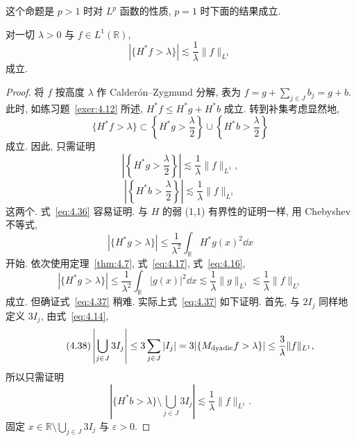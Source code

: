 这个命题是 $p > 1$ 时对 $L^{p}$ 函数的性质, $p = 1$ 时下面的结果成立.

\begin{theorem}\label{thm:4.8}
对一切 $\lambda > 0$ 与 $f \in L^{1}(\mathbb{R})$,
\begin{equation}\tag{4.34}
|\{H^{*}f > \lambda\}| \lesssim \frac{1}{\lambda}\|f\|_{L^{1}}
\label{eq:4.34}
\end{equation}
成立.
\end{theorem}

\begin{proof}
将 $f$ 按高度 $\lambda$ 作 Calderón--Zygmund 分解, 表为 $f = g + \sum_{j \in J}b_{j} = g + b$. 此时, 如练习题~\ref{exer:4.12} 所述, $H^{*}f \leq H^{*}g + H^{*}b$ 成立. 转到补集考虑显然地,
\begin{equation}\tag{4.35}
\{H^{*}f > \lambda\} \subset \left\{H^{*}g > \frac{\lambda}{2}\right\} \cup \left\{H^{*}b > \frac{\lambda}{2}\right\}
\label{eq:4.35}
\end{equation}
成立. 因此, 只需证明
\begin{equation}\tag{4.36}
\left|\left\{H^{*}g > \frac{\lambda}{2}\right\}\right| \lesssim \frac{1}{\lambda}\|f\|_{L^{1}},
\label{eq:4.36}
\end{equation}
\begin{equation}\tag{4.37}
\left|\left\{H^{*}b > \frac{\lambda}{2}\right\}\right| \lesssim \frac{1}{\lambda}\|f\|_{L^{1}}
\label{eq:4.37}
\end{equation}
这两个. 式~\eqref{eq:4.36} 容易证明. 与 $H$ 的弱 (1,1) 有界性的证明一样, 用 Chebyshev 不等式,
\[
|\{H^{*}g > \lambda\}| \leq \frac{1}{\lambda^{2}}\int_{\mathbb{R}}H^{*}g(x)^{2}\dd x
\]
开始. 依次使用定理~\ref{thm:4.7}, 式~\eqref{eq:4.17}, 式~\eqref{eq:4.16},
\[
|\{H^{*}g > \lambda\}| \leq \frac{1}{\lambda^{2}}\int_{\mathbb{R}}|g(x)|^{2}\dd x \lesssim \frac{1}{\lambda}\|g\|_{L^{1}} \lesssim \frac{1}{\lambda}\|f\|_{L^{1}}
\]
成立. 但确证式~\eqref{eq:4.37} 稍难. 实际上式~\eqref{eq:4.37} 如下证明. 首先, 与 $2I_{j}$ 同样地定义 $3I_{j}$, 由式~\eqref{eq:4.14},
\begin{equation}\tag{4.38}
\left|\bigcup_{j \in J}3I_{j}\right| \leq 3\sum_{j \in J}|I_{j}| = 3|\{M_{\mathrm{dyadic}}f > \lambda\}| \leq \frac{3}{\lambda}\|f\|_{L^{1}},
\label{eq:4.38}
\end{equation}
所以只需证明
\begin{equation}\tag{4.39}
\left|\{H^{*}b > \lambda\} \setminus \bigcup_{j \in J}3I_{j}\right| \lesssim \frac{1}{\lambda}\|f\|_{L^{1}}.
\label{eq:4.39}
\end{equation}
固定 $x \in \mathbb{R}\setminus\bigcup_{j \in J}3I_{j}$ 与 $\varepsilon > 0$.


\end{proof}
